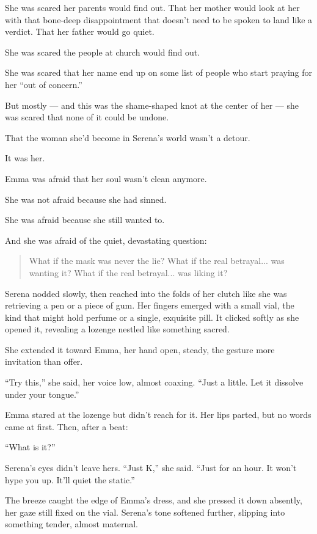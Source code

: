 She was scared her parents would find out.
That her mother would look at her with that bone-deep disappointment that doesn’t need to be spoken to 
land like a verdict.
That her father would go quiet.

She was scared the people at church would find out.

She was scared that her name end up on some list of people who start praying for her ``out of concern.''

But mostly --- and this was the shame-shaped knot at the center of her ---
she was scared that none of it could be undone.

That the woman she’d become in Serena’s world wasn’t a detour.

It was her.

Emma was afraid that her soul wasn’t clean anymore. 

She was not afraid because she had sinned. 

She was afraid because she still wanted to.

And she was afraid of the quiet, devastating question:

\begin{quote}
What if the mask was never the lie?
What if the real betrayal... was wanting it?
What if the real betrayal... was liking it?
\end{quote}

Serena nodded slowly, then reached into the folds of her clutch like she was retrieving a pen 
or a piece of gum. Her fingers emerged with a small vial, the kind that might hold perfume or a single, 
exquisite pill. It clicked softly as she opened it, revealing a lozenge nestled like something sacred.

She extended it toward Emma, her hand open, steady, the gesture more invitation than offer.

``Try this,'' she said, her voice low, almost coaxing. ``Just a little. Let it dissolve under your tongue.''

Emma stared at the lozenge but didn’t reach for it. Her lips parted, but no words came at first. Then, 
after a beat:

``What is it?''

Serena’s eyes didn’t leave hers. ``Just K,'' she said. ``Just for an hour. It won’t hype you up. It’ll 
quiet the static.''

The breeze caught the edge of Emma’s dress, and she pressed it down absently, her gaze still fixed 
on the vial. Serena’s tone softened further, slipping into something tender, almost maternal.

